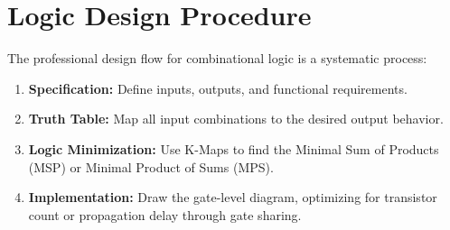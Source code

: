 \section{Logic Design Procedure}

\begin{remark}
The professional design flow for combinational logic is a systematic process:
\begin{enumerate}
    \item \textbf{Specification:} Define inputs, outputs, and functional requirements.
    \item \textbf{Truth Table:} Map all input combinations to the desired output behavior.
    \item \textbf{Logic Minimization:} Use K-Maps to find the Minimal Sum of Products (MSP) or Minimal Product of Sums (MPS).
    \item \textbf{Implementation:} Draw the gate-level diagram, optimizing for transistor count or propagation delay through gate sharing.
\end{enumerate}
\end{remark}
